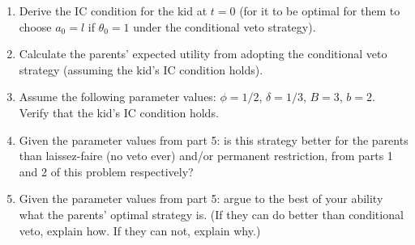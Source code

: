 \documentclass[a4paper]{article}
\newif\ifsolutions
\begin{document}
	\begin{enumerate}[resume]
		\item Derive the IC condition for the kid at $t=0$ (for it to be optimal for them to choose $a_0=l$ if $\theta_0=1$ under the conditional veto strategy).
		
		\item Calculate the parents' expected utility from adopting the conditional veto strategy (assuming the kid's IC condition holds).
		
		\item Assume the following parameter values: $\phi=1/2$, $\delta=1/3$, $B=3$, $b=2$. Verify that the kid's IC condition holds.
		
		\item Given the parameter values from part 5: is this strategy better for the parents than laissez-faire (no veto ever) and/or permanent restriction, from parts 1 and 2 of this problem respectively?
		
		\item Given the parameter values from part 5: argue to the best of your ability what the parents' optimal strategy is. (If they can do better than conditional veto, explain how. If they can not, explain why.)
	\end{enumerate}
		
		
	
	
\ifsolutions
\end{document}
